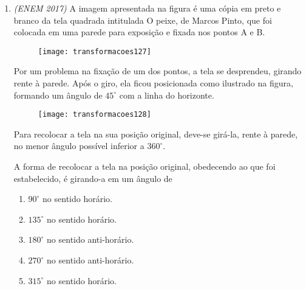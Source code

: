 \begin{enumerate}
\begin{multicols}{2}
\begin{enumerate}[itemsep=1em]
\item {}
{
\texttt{[image: transformacoes126]}
}

\item {}
{
\texttt{[image: transformacoes126]}
}
\item {}
{
\texttt{[image: transformacoes126]}
}
\item {}
{
\texttt{[image: transformacoes126]}
}
\item {}
{
\texttt{[image: transformacoes126]}
} 
\end{enumerate}
\end{multicols}

\item \textit{(ENEM 2017)} A imagem apresentada na figura é uma cópia em preto e branco da tela quadrada intitulada O peixe, de Marcos Pinto, que foi colocada em uma parede para exposição e fixada nos pontos A e B.
\begin{figure}[H]
\centering

\texttt{[image: transformacoes127]}
\end{figure}

Por um problema na fixação de um dos pontos, a tela se desprendeu, girando rente à parede. Após o giro, ela ficou posicionada como ilustrado na figura, formando um ângulo de $45^{\circ}$ com a linha do horizonte.

\begin{figure}[H]
\centering

\texttt{[image: transformacoes128]}
\end{figure}

Para recolocar a tela na sua posição original, deve-se girá-la, rente à parede, no menor ângulo possível inferior a $360^{\circ}$.

A forma de recolocar a tela na posição original, obedecendo ao que foi estabelecido, é girando-a em um ângulo de
\begin{enumerate}
\item $90^{\circ}$ no sentido horário.
\item $135^{\circ}$ no sentido horário.
\item $180^{\circ}$ no sentido anti-horário.
\item $270^{\circ}$ no sentido anti-horário.
\item $315^{\circ}$ no sentido horário.
\end{enumerate}


\end{enumerate}

